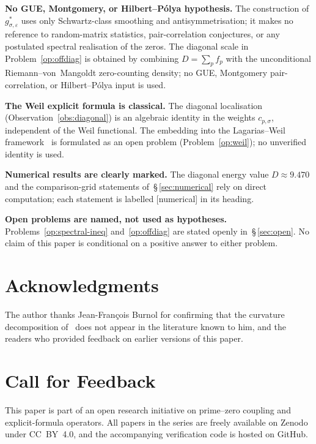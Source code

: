 \documentclass[11pt]{article}
\begin{document}
\textbf{No GUE, Montgomery, or Hilbert--P\'olya hypothesis.}
The construction of $g^*_{\sigma,\varepsilon}$ uses only
Schwartz-class smoothing and antisymmetrisation; it makes no
reference to random-matrix statistics, pair-correlation
conjectures, or any postulated spectral realisation of the
zeros.
The diagonal scale in Problem~\ref{op:offdiag} is obtained by
combining $D=\sum_p f_p$ with the unconditional
Riemann--von~Mangoldt zero-counting density; no GUE,
Montgomery pair-correlation, or Hilbert--P\'olya input is used.

\textbf{The Weil explicit formula is classical.}
The diagonal localisation (Observation~\ref{obs:diagonal})
is an algebraic identity in the weights $c_{p,\sigma}$,
independent of the Weil functional.
The embedding into the Lagarias--Weil
framework~\cite{Lagarias} is formulated as an open problem
(Problem~\ref{op:weil}); no unverified identity is used.

\textbf{Numerical results are clearly marked.}
The diagonal energy value $D\approx 9.470$ and the
comparison-grid statements of~\S\,\ref{sec:numerical} rely on
direct computation; each statement is labelled [numerical] in
its heading.

\textbf{Open problems are named, not used as hypotheses.}
Problems~\ref{op:spectral-ineq} and~\ref{op:offdiag} are stated
openly in~\S\,\ref{sec:open}.
No claim of this paper is conditional on a positive answer to
either problem.

\section*{Acknowledgments}

The author thanks Jean-Fran\c{c}ois Burnol for confirming that
the curvature decomposition of~\cite{Paper1} does not appear in
the literature known to him, and the readers who provided
feedback on earlier versions of this paper.

\section*{Call for Feedback}

This paper is part of an open research initiative on prime--zero
coupling and explicit-formula operators.
All papers in the series are freely available on Zenodo under
CC~BY~4.0, and the accompanying verification code is hosted on
GitHub.
\end{document}
